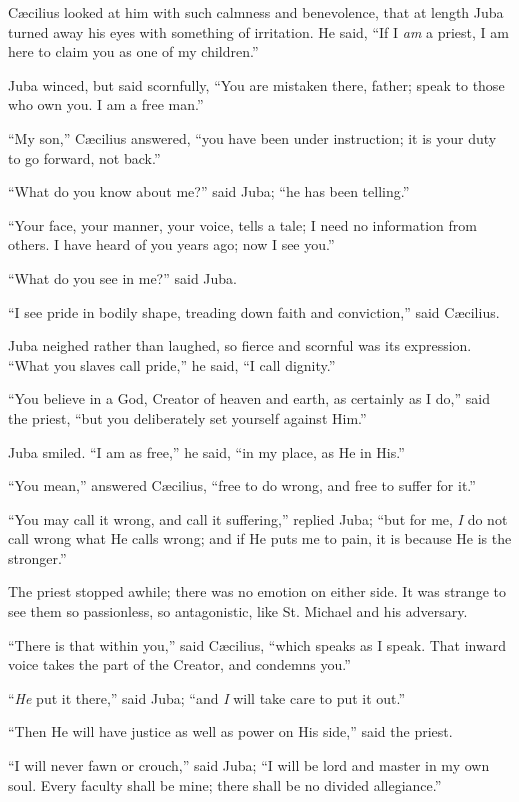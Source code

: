 Cæcilius looked at him with such calmness and benevolence, that at
length Juba turned away his eyes with something of irritation. He
said, ``If I \emph{am} a priest, I am here to claim you as one of
my children.''

Juba winced, but said scornfully, ``You are mistaken there,
father; speak to those who own you. I am a free man.''

``My son,'' Cæcilius answered, ``you have been under
instruction; it is your duty to go forward, not back.''

``What do you know about me?'' said Juba; ``he has been
telling.''

``Your face, your manner, your voice, tells a tale; I need no
information from others. I have heard of you years ago; now I see
you.''

``What do you see in me?'' said Juba.

``I see pride in bodily shape, treading down faith and
conviction,'' said Cæcilius.

Juba neighed rather than laughed, so fierce and scornful was its
expression. ``What you slaves call pride,'' he said, ``I
call dignity.''

``You believe in a God, Creator of heaven and earth, as
certainly as I do,'' said the priest, ``but you deliberately
set yourself against Him.''

Juba smiled. ``I am as free,'' he said, ``in my place,
as He in His.''

``You mean,'' answered Cæcilius, ``free to do wrong,
and free to suffer for it.''

``You may call it wrong, and call it suffering,'' replied
Juba; ``but for me, \emph{I} do not call wrong what He calls
wrong; and if He puts me to pain, it is because He is the
stronger.''

The priest stopped awhile; there was no emotion on either side. It
was strange to see them so passionless, so antagonistic, like St.
Michael and his adversary.

``There is that within you,'' said Cæcilius, ``which
speaks as I speak. That inward voice takes the part of the
Creator, and condemns you.''

``\emph{He} put it there,'' said Juba; ``and \emph{I}
will take care to put it out.''

``Then He will have justice as well as power on His side,''
said the priest.

``I will never fawn or crouch,'' said Juba; ``I will be
lord and master in my own soul. Every faculty shall be mine; there
shall be no divided allegiance.''

